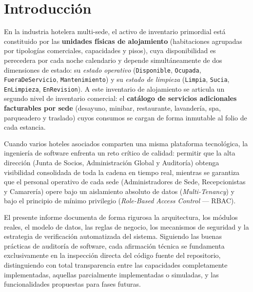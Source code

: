 \documentclass[12pt,a4paper]{article}
\begin{document}
\section{Introducci\'on}

En la industria hotelera multi-sede, el activo de inventario primordial est\'a constituido por las \textbf{unidades f\'isicas de alojamiento} (habitaciones agrupadas por tipolog\'ias comerciales, capacidades y pisos), cuya disponibilidad es perecedera por cada noche calendario y depende simult\'aneamente de dos dimensiones de estado: su \textit{estado operativo} (\texttt{Disponible}, \texttt{Ocupada}, \texttt{FueraDeServicio}, \texttt{Mantenimiento}) y su \textit{estado de limpieza} (\texttt{Limpia}, \texttt{Sucia}, \texttt{EnLimpieza}, \texttt{EnRevision}). A este inventario de alojamiento se articula un segundo nivel de inventario comercial: el \textbf{cat\'alogo de servicios adicionales facturables por sede} (desayuno, minibar, restaurante, lavander\'ia, spa, parqueadero y traslado) cuyos consumos se cargan de forma inmutable al folio de cada estancia.

Cuando varios hoteles asociados comparten una misma plataforma tecnol\'ogica, la ingenier\'ia de software enfrenta un reto cr\'itico de calidad: permitir que la alta direcci\'on (Junta de Socios, Administraci\'on Global y Auditor\'ia) obtenga visibilidad consolidada de toda la cadena en tiempo real, mientras se garantiza que el personal operativo de cada sede (Administradores de Sede, Recepcionistas y Camarer\'ia) opere bajo un aislamiento absoluto de datos (\textit{Multi-Tenancy}) y bajo el principio de m\'inimo privilegio (\textit{Role-Based Access Control} --- RBAC).

El presente informe documenta de forma rigurosa la arquitectura, los m\'odulos reales, el modelo de datos, las reglas de negocio, los mecanismos de seguridad y la estrategia de verificaci\'on automatizada del sistema. Siguiendo las buenas pr\'acticas de auditor\'ia de software, cada afirmaci\'on t\'ecnica se fundamenta exclusivamente en la inspecci\'on directa del c\'odigo fuente del repositorio, distinguiendo con total transparencia entre las capacidades completamente implementadas, aquellas parcialmente implementadas o simuladas, y las funcionalidades propuestas para fases futuras.

\end{document}
